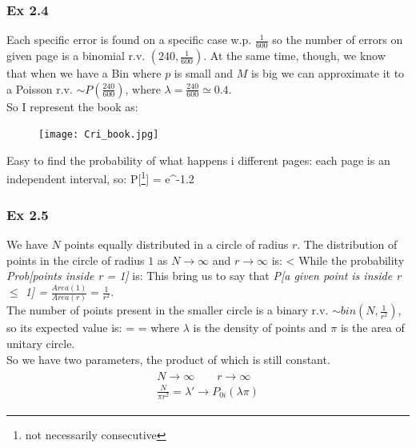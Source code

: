 	\subsubsection*{Ex 2.4}
	Each specific error is found on a specific case w.p. $\frac{1}{600}$ so the number of errors on given page is a binomial r.v. $(240,\frac{1}{600})$. At the same time, though, we know that when we have a Bin where $p$ is small and $M$ is big we can approximate it to a Poisson r.v. $\sim P(\frac{240}{600})$, where $\lambda = \frac{240}{600}  \simeq 0.4$.\\
	So I represent the book as:
	\begin{figure}[h]
	\centering
	\texttt{[image: Cri\_book.jpg]}
	\label{fig:book}
	\end{figure}
	Easy to find the probability of what happens i different pages: each page is an independent interval, so:
	\beq
	P[\footnote{not necessarily consecutive}] = e^{-1.2}
	\eeq
	\subsubsection*{Ex 2.5}
	We have $N$ points equally distributed in a circle of radius $r$. The distribution of points in the circle of radius $1$ as $N \to \infty$ and $r \to \infty$ is:
	\beq
	 < \lambda
	\eeq
	While the probability \textit{Prob[points inside r = 1]} is:
	\beq
	\eeq
	This bring us to say that \textit{P[a given point is inside r $\leq$ 1] = } $\frac{Area(1)}{Area(r)} = \frac{1}{r^2}$.\\
	The number of points present in the smaller circle is a binary r.v. $\sim bin(N,\frac{1}{r^2})$, so its expected value is:
	\beq
	 =  = \lambda\pi
	\eeq
	where $\lambda$ is the density of points and $\pi$ is the area of unitary circle.\\
	So we have two parameters, the product of which is still constant.
	\begin{align}
	\begin{split}
	N \to \infty \qquad r \to \infty\\
	\frac{N}{\pi r^2} = \lambda' \rightarrow P_{0i}(\lambda\pi)
	\end{split}
	\end{align}

